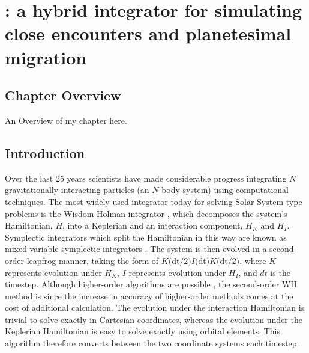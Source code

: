\chapter[\hermes: A hybrid integrator]{\hermes: a hybrid integrator for simulating close encounters and planetesimal migration}

\section{Chapter Overview}

An Overview of my chapter here.

\section{Introduction}
\label{sec:intro}
Over the last 25 years scientists have made considerable progress integrating $N$ gravitationally interacting particles (an $N$-body system) using computational techniques. 
The most widely used integrator today for solving Solar System type problems is the Wisdom-Holman integrator \citep[hereafter WH]{Wisdom1991}, which decomposes the system's Hamiltonian, $H$, into a Keplerian and an interaction component, $H_K$ and $H_I$. 
Symplectic integrators which split the Hamiltonian in this way are known as mixed-variable symplectic integrators \citep{Wisdom1991, Saha1992}.
The system is then evolved in a second-order leapfrog manner, taking the form of $K($dt$/2) I($dt$) K($dt$/2)$, where $K$ represents evolution under $H_K$, $I$ represents evolution under $H_I$, and $dt$ is the timestep.
Although higher-order algorithms are possible \citep[e.g.][]{Yoshida1990}, the second-order WH method is  since the  increase in accuracy of higher-order methods comes at the cost of  additional calculation. 
The evolution under the interaction Hamiltonian is trivial to solve exactly in Cartesian coordinates, whereas the evolution under the Keplerian Hamiltonian is easy to solve exactly using orbital elements. 
This algorithm therefore converts between the two coordinate systems each timestep.

